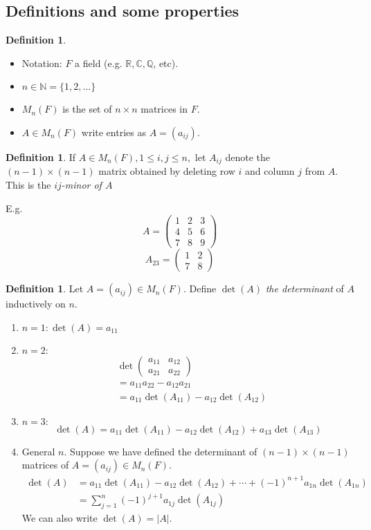 \documentclass{report}
\theoremstyle{remark}
\theoremstyle{definition}
\newtheorem{definition}[theorem]{Definition}
\theoremstyle{definition}
\theoremstyle{theorem}
\begin{document}
\subsection{Definitions and some properties}
\begin{definition}
\begin{itemize}
    \item Notation: $F$ a field (e.g. $\mathbb{R}, \mathbb{C}, \mathbb{Q}$, etc).
    \item $n \in \mathbb{N} = \{1,2,...\}$
    \item $M_n(F)$ is the set of $n \times n$ matrices in $F$.
    \item $A \in M_n(F)$ write entries as $A = (a_{ij})$.
\end{itemize} 
\end{definition}
\begin{definition}
If $A \in M_n(F), 1 \leq i,j \leq n,$ let $A_{ij}$ denote the $(n-1) \times (n-1)$ matrix obtained by deleting row $i$ and column $j$ from $A$. This is the \emph{$ij$-minor of $A$}
\end{definition}
E.g.
\[ A = \begin{pmatrix}
1&2&3\\
4&5&6\\
7&8&9
\end{pmatrix}
\]
\[A_{23}=\begin{pmatrix}
1&2\\
7&8
\end{pmatrix}
\]
\begin{definition}
Let $A = (a_{ij}) \in M_n(F)$. Define $\det(A)$ \emph{the determinant} of $A$ inductively on $n$.
\begin{enumerate}[label=\roman*]
    \item $n=1: \det(A)=a_{11}$
    \item $n=2:$ \begin{align*}
        & \det\begin{pmatrix}
    a_{11}&a_{12}\\
    a_{21}&a_{22}
    \end{pmatrix} \\
    &= a_{11}a_{22}-a_{12}a_{21}\\
    &= a_{11}\det(A_{11}) - a_{12}\det(A_{12})
    \end{align*}
    \item $n=3:$ \[
        \det(A)=a_{11}\det(A_{11})-a_{12}\det(A_{12})+a_{13}\det(A_{13})
    \]
    \item General $n$. Suppose we have defined the determinant of $(n-1) \times (n-1)$ matrices of $A = (a_{ij}) \in M_n(F)$.
    \begin{align*}
        \det(A)&=a_{11}\det(A_{11})-a_{12}\det(A_{12})+\cdots+(-1)^{n+1}a_{1n}\det(A_{1n})\\
        &= \sum^n_{j=1}(-1)^{j+1}a_{1j}\det(A_{1j})
    \end{align*}
    We can also write $\det(A)=|A|$.
\end{enumerate}
\end{definition}
\end{document}
